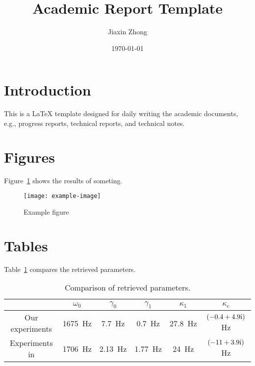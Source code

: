 \documentclass{article}
\title{\textbf{Academic Report Template}}
\author{Jiaxin Zhong}
\date{\today}
\begin{document}
\maketitle
\thispagestyle{firststyle}

\section{Introduction}
This is a \LaTeX{} template designed for daily writing the academic documents, e.g., progress reports, technical reports, and technical notes.

\lipsum[1]

\lipsum[2]

\lipsum[3]

\lipsum[4]

\lipsum[5]

\lipsum[6]

\section{Figures}
Figure~\ref{fig:39:f020390} shows the results of someting.
\begin{figure}[!htb]
    \centering
    \texttt{[image: example-image]}
    \caption{Example figure}
    \label{fig:39:f020390}
\end{figure}

\section{Tables}
Table~\ref{tab:f20} compares the retrieved parameters.
\begin{table}[!htb]
    \centering
    \caption{Comparison of retrieved parameters.}
    \begin{tabular}{cccccc}
        \toprule
         & $\omega_0$ 
         & $\gamma_0$
         & $\gamma_1$
         & $\kappa_1$
         & $\kappa_\mathrm{c}$
         \\
        \midrule
        Our experiments 
         & 
         1675~Hz
         &
         7.7~Hz
         & 
         0.7~Hz
         &
         27.8~Hz
         & 
         $\qty(-0.4+4.9\mathrm{i})$ Hz\\
         Experiments in \cite{Zhang2021AcousticNonHermitianSkin}
         & 
         1706~Hz
         &
         2.13~Hz
         & 
         1.77~Hz
         &
         24~Hz
         & 
         $\qty(-11+3.9\mathrm{i})$ Hz\\
        \bottomrule
    \end{tabular}
    \label{tab:f20}
\end{table}
\end{document}
